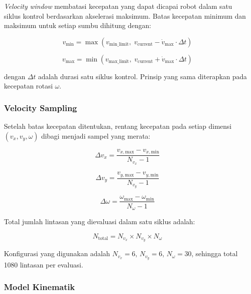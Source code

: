 \emph{Velocity window} membatasi kecepatan yang dapat dicapai robot
dalam satu siklus kontrol berdasarkan akselerasi maksimum. Batas
kecepatan minimum dan maksimum untuk setiap sumbu dihitung dengan:

\begin{equation}
v_{\text{min}} = \max\left(v_{\text{min\_limit}},\;
v_{\text{current}} - \dot{v}_{\text{max}} \cdot \Delta t\right)
\end{equation}

\begin{equation}
v_{\text{max}} = \min\left(v_{\text{max\_limit}},\;
v_{\text{current}} + \dot{v}_{\text{max}} \cdot \Delta t\right)
\end{equation}

dengan $\Delta t$ adalah durasi satu siklus kontrol. Prinsip yang
sama diterapkan pada kecepatan rotasi $\omega$.

\subsubsection{Velocity Sampling}

Setelah batas kecepatan ditentukan, rentang kecepatan pada setiap
dimensi $(v_x, v_y, \omega)$ dibagi menjadi sampel yang merata:

\begin{equation}
\Delta v_x = \frac{v_{x,\text{max}} - v_{x,\text{min}}}{N_{v_x} - 1}
\end{equation}

\begin{equation}
\Delta v_y = \frac{v_{y,\text{max}} - v_{y,\text{min}}}{N_{v_y} - 1}
\end{equation}

\begin{equation}
\Delta \omega = \frac{\omega_{\text{max}} - \omega_{\text{min}}}{N_{\omega} - 1}
\end{equation}

Total jumlah lintasan yang dievaluasi dalam satu siklus adalah:

\begin{equation}
N_{\text{total}} = N_{v_x} \times N_{v_y} \times N_{\omega}
\end{equation}

Konfigurasi yang digunakan adalah $N_{v_x} = 6$, $N_{v_y} = 6$,
$N_{\omega} = 30$, sehingga total 1080 lintasan per evaluasi.

\subsubsection{Model Kinematik}

